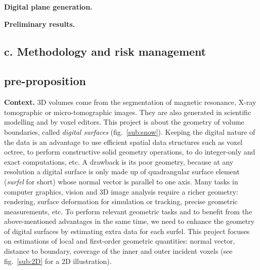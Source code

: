 
\noindent\textbf{Digital plane generation.}


\noindent\textbf{Preliminary results.}

\subsection{c. Methodology and risk management}





\subsection{pre-proposition}

\noindent\textbf{Context.} 
3D volumes come from the segmentation of magnetic resonance, X-ray tomographic or micro-tomographic images. 
They are also generated in scientific modelling and by voxel editors. 
This project is about the geometry of volume boundaries, called \emph{digital surfaces} (fig.~\ref{sub:snow}). 
Keeping the digital nature of the data is an advantage
to use efficient spatial data structures such as voxel octree, 
to perform constructive solid geometry operations,
to do integer-only and exact computations, etc.
A drawback is its poor geometry, because at any resolution a digital surface is only 
made up of quadrangular surface element (\emph{surfel} for short) 
whose normal vector is parallel to one axis. 
Many tasks in computer graphics, vision and 3D image analysis require a richer geometry: 
rendering, surface deformation for simulation or tracking, precise geometric measurements, etc.
To perform relevant geometric tasks and 
to benefit from the above-mentioned advantages in the same time, 
we need to enhance the geometry of digital surfaces by estimating extra data for each surfel. 
This project focuses on estimations of local and first-order geometric quantities: 
normal vector, distance to boundary, coverage of the inner and outer incident voxels 
(see fig.~\ref{sub:2D} for a 2D illustration).  


